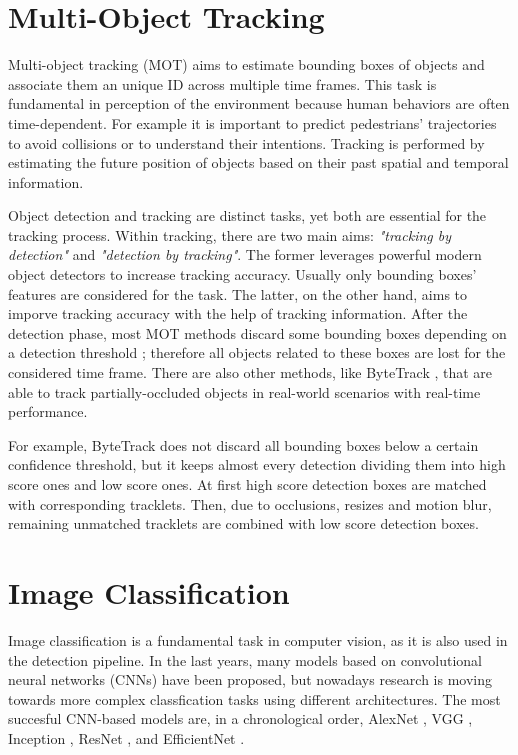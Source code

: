 \section {Multi-Object Tracking}
Multi-object tracking (MOT) aims to estimate bounding boxes of objects and 
associate them an unique ID across multiple time frames. This task is 
fundamental in perception of the environment because human behaviors are often 
time-dependent. For example it is important to predict pedestrians' trajectories 
to avoid collisions or to understand their intentions. Tracking is performed by 
estimating the future position of objects based on their past spatial and 
temporal information.

Object detection and tracking are distinct tasks, yet both are essential for 
the tracking process. Within tracking, there are two main aims: 
\textit{"tracking by detection"} and \textit{"detection by tracking"}. 
The former leverages powerful modern object detectors to increase tracking 
accuracy. Usually only bounding boxes' features are considered for the task.
The latter, on the other hand, aims to imporve tracking accuracy with the help 
of tracking information. After the detection phase, most MOT methods discard 
some bounding boxes depending on a detection threshold 
\cite{retinatrack,transtrack}; 
therefore all objects related to these boxes are lost for the considered time 
frame. There are also other methods, like ByteTrack \cite{bytetrack}, that are 
able to track partially-occluded objects in real-world scenarios with 
real-time performance. 

For example, ByteTrack does not discard all bounding 
boxes below a certain confidence threshold, but it keeps almost every detection 
dividing them into high score ones and low score ones. At first high score 
detection boxes are matched with corresponding tracklets. Then, due to 
occlusions, resizes and motion blur, remaining unmatched tracklets are 
combined with low score detection boxes. 

\section{Image Classification}
Image classification is a fundamental task in computer vision, as it is also 
used in the detection pipeline. In the last years, many models based on 
convolutional neural networks (CNNs) have been proposed, but nowadays research 
is moving towards more complex classfication tasks using different 
architectures.
The most succesful CNN-based models are, in a chronological order, 
AlexNet \cite{alexnet}, 
VGG \cite{vggnet}, Inception \cite{inception}, ResNet \cite{resnet}, and 
EfficientNet \cite{efficientnet}.

